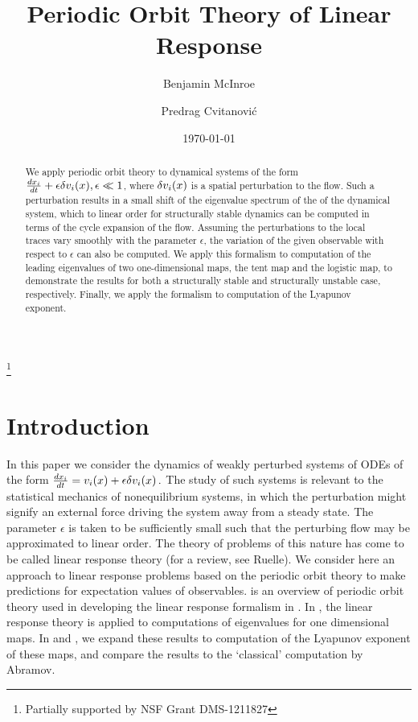 \documentclass[aps,pre,
                showpacs,
                twocolumn,
                groupedaddress,
                superscriptaddress,
                floatfix]{revtex4-1}
\begin{document}
\title{Periodic Orbit Theory of Linear Response}
\author{Benjamin McInroe}
\author{Predrag Cvitanovi\'c}
\thanks{Partially supported by NSF Grant DMS-1211827}

\date{\today}

\begin{abstract}
We apply periodic orbit theory to dynamical systems of
the form $\frac{dx_{i}}{dt}+\epsilon \delta v_{i}(x), \epsilon \ll 1$,
where $\delta v_{i}(x)$ is a spatial perturbation to the flow. Such a
perturbation results in a small shift of the eigenvalue spectrum of the
{\evOper} of the dynamical system, which to linear order for
structurally stable dynamics can be computed in terms of the cycle
expansion of the flow. Assuming the perturbations to the local traces
vary smoothly with the parameter $\epsilon$, the variation of the
 given observable with respect to $\epsilon$ can
also be computed. We apply this formalism to computation of the leading
eigenvalues of two one-dimensional maps, the tent map and the logistic
map, to demonstrate the results for both a structurally stable and
structurally unstable case, respectively. Finally, we apply the formalism
to computation of the Lyapunov exponent.
\end{abstract}

\maketitle



\section{Introduction}
\label{sect:intro}

In this paper we consider the dynamics of weakly perturbed systems of ODEs of
the form
\(
\frac{dx_{i}}{dt}=v_{i}(x) + \epsilon \delta v_{i}(x)
\,.
\) %
The study of such systems is relevant to the statistical mechanics of
nonequilibrium systems, in which the perturbation might signify an
external force driving the system away from a steady state. The
parameter $\epsilon$ is taken to be sufficiently small such that the
perturbing flow may be approximated to linear order. The
theory of problems of this nature has come to be
called linear response theory (for a review, see Ruelle).
We consider here an
approach to linear response problems based on the periodic
orbit theory to make predictions for expectation values of
observables.   is an overview of periodic orbit
theory used in developing the linear response formalism in
. In , the linear response
theory is applied to computations of eigenvalues for one dimensional
maps. In  and , we expand these
results to computation of the Lyapunov exponent of these maps, and
compare the results to the `classical' computation by
Abramov.
\end{document}
